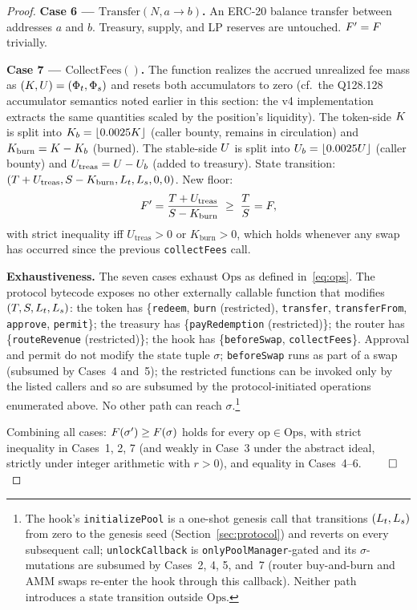 \begin{proof}
\textbf{Case 6 --- $\text{Transfer}(N, a \to b)$.} An ERC-20 balance transfer between addresses $a$ and $b$. Treasury, supply, and LP reserves are untouched. $F' = F$ trivially.

\textbf{Case 7 --- $\text{CollectFees}()$.} The function realizes the accrued unrealized fee mass as $(K, U) = (\Phi_t, \Phi_s)$ and resets both accumulators to zero (cf.\ the Q128.128 accumulator semantics noted earlier in this section: the v4 implementation extracts the same quantities scaled by the position's liquidity). The token-side $K$ is split into $K_b = \lfloor 0.0025 K \rfloor$ (caller bounty, remains in circulation) and $K_{\text{burn}} = K - K_b$ (burned). The stable-side $U$ is split into $U_b = \lfloor 0.0025 U \rfloor$ (caller bounty) and $U_{\text{treas}} = U - U_b$ (added to treasury). State transition: $(T + U_{\text{treas}}, S - K_{\text{burn}}, L_t, L_s, 0, 0)$. New floor:
\[
F' = \frac{T + U_{\text{treas}}}{S - K_{\text{burn}}} \;\geq\; \frac{T}{S} = F,
\]
with strict inequality iff $U_{\text{treas}} > 0$ or $K_{\text{burn}} > 0$, which holds whenever any swap has occurred since the previous \texttt{collectFees} call.

\textbf{Exhaustiveness.} The seven cases exhaust $\mathrm{Ops}$ as defined in~\eqref{eq:ops}. The protocol bytecode exposes no other externally callable function that modifies $(T, S, L_t, L_s)$: the token has \{\texttt{redeem}, \texttt{burn} (restricted), \texttt{transfer}, \texttt{transferFrom}, \texttt{approve}, \texttt{permit}\}; the treasury has \{\texttt{payRedemption} (restricted)\}; the router has \{\texttt{routeRevenue} (restricted)\}; the hook has \{\texttt{beforeSwap}, \texttt{collectFees}\}. Approval and permit do not modify the state tuple $\sigma$; \texttt{beforeSwap} runs as part of a swap (subsumed by Cases~4 and~5); the restricted functions can be invoked only by the listed callers and so are subsumed by the protocol-initiated operations enumerated above. No other path can reach $\sigma$.\footnote{The hook's \texttt{initializePool} is a one-shot genesis call that transitions $(L_t, L_s)$ from zero to the genesis seed (Section~\ref{sec:protocol}) and reverts on every subsequent call; \texttt{unlockCallback} is \texttt{onlyPoolManager}-gated and its $\sigma$-mutations are subsumed by Cases~2, 4, 5, and~7 (router buy-and-burn and AMM swaps re-enter the hook through this callback). Neither path introduces a state transition outside $\mathrm{Ops}$.}

Combining all cases: $F(\sigma') \geq F(\sigma)$ holds for every $\text{op} \in \mathrm{Ops}$, with strict inequality in Cases~1, 2, 7 (and weakly in Case~3 under the abstract ideal, strictly under integer arithmetic with $r > 0$), and equality in Cases~4--6. $\qed$
\end{proof}

